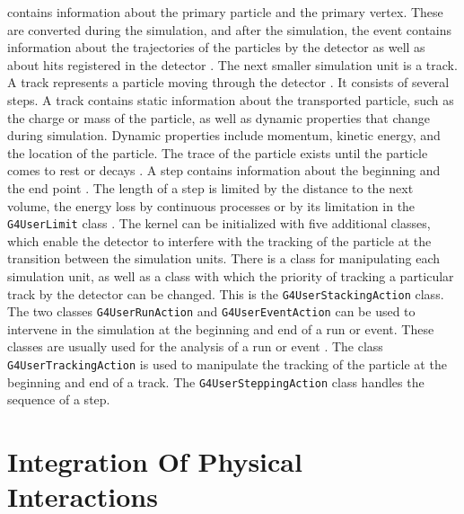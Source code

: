 \documentclass[12pt, a4paper]{thesis}
\begin{document}
contains information about the primary particle and the primary
vertex. These are converted during the simulation, and after the
simulation, the event contains information about the trajectories of
the particles by the detector as well as about hits registered in the
detector \cite{geant_simul_toolk}. The next smaller simulation unit is
a track. A track represents a particle moving through the detector
\cite{geant4-doc}. It consists of several steps. A track contains
static information about the transported particle, such as the charge
or mass of the particle, as well as dynamic properties that change
during simulation. Dynamic properties include momentum, kinetic
energy, and the location of the particle. The trace of the particle
exists until the particle comes to rest or decays \cite{geant4-doc}. A
step contains information about the beginning and the end point
\cite{geant4-doc}. The length of a step is limited by the distance to
the next volume, the energy loss by continuous processes or by its
limitation in the \texttt{G4UserLimit} class \cite{geant_simul_toolk}.
The kernel can be initialized with five additional classes, which
enable the detector to interfere with the tracking of the particle at
the transition between the simulation units. There is a class for
manipulating each simulation unit, as well as a class with which the
priority of tracking a particular track by the detector can be
changed. This is the \texttt{G4UserStackingAction} class. The two
classes \texttt{G4UserRunAction} and \texttt{G4UserEventAction} can be
used to intervene in the simulation at the beginning and end of a run
or event. These classes are usually used for the analysis of a run or
event \cite{geant4-doc}. The class \texttt{G4UserTrackingAction} is
used to manipulate the tracking of the particle at the beginning and
end of a track. The \texttt{G4UserSteppingAction} class handles the
sequence of a step.

\section{Integration Of Physical Interactions}
\label{sec:org40783eb}
\end{document}
